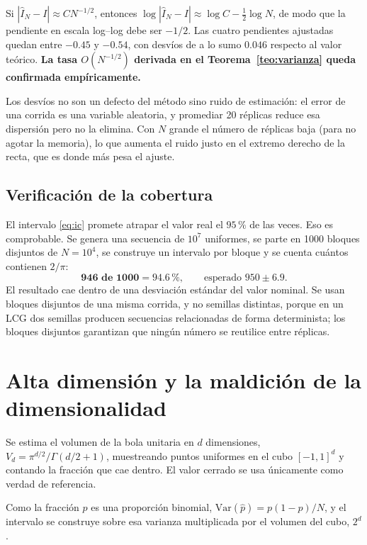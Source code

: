 Si $|\hat I_N - I| \approx C N^{-1/2}$, entonces
$\log|\hat I_N - I| \approx \log C - \tfrac12 \log N$, de modo que la pendiente
en escala log--log debe ser $-1/2$. Las cuatro pendientes ajustadas quedan
entre $-0.45$ y $-0.54$, con desvíos de a lo sumo $0.046$ respecto al valor
teórico. \textbf{La tasa $O(N^{-1/2})$ derivada en el
Teorema~\ref{teo:varianza} queda confirmada empíricamente.}

Los desvíos no son un defecto del método sino ruido de estimación: el error de
una corrida es una variable aleatoria, y promediar 20 réplicas reduce esa
dispersión pero no la elimina. Con $N$ grande el número de réplicas baja (para
no agotar la memoria), lo que aumenta el ruido justo en el extremo derecho de
la recta, que es donde más pesa el ajuste.

\subsection{Verificación de la cobertura}

El intervalo \eqref{eq:ic} promete atrapar el valor real el $95\,\%$ de las
veces. Eso es comprobable. Se genera una secuencia de $10^7$ uniformes, se
parte en 1000 bloques disjuntos de $N = 10^4$, se construye un intervalo por
bloque y se cuenta cuántos contienen $2/\pi$:
\[
  \textbf{946 de 1000} = 94.6\,\% ,
  \qquad \text{esperado } 950 \pm 6.9 .
\]
El resultado cae dentro de una desviación estándar del valor nominal. Se usan
bloques disjuntos de una misma corrida, y no semillas distintas, porque en un
LCG dos semillas producen secuencias relacionadas de forma determinista; los
bloques disjuntos garantizan que ningún número se reutilice entre réplicas.

\section{Alta dimensión y la maldición de la dimensionalidad}
\label{sec:mc-alta-dimension}

Se estima el volumen de la bola unitaria en $d$ dimensiones,
$V_d = \pi^{d/2}/\Gamma(d/2+1)$, muestreando puntos uniformes en el cubo
$[-1,1]^d$ y contando la fracción que cae dentro. El valor cerrado se usa
únicamente como verdad de referencia.

Como la fracción $p$ es una proporción binomial, $\mathrm{Var}(\hat p) =
p(1-p)/N$, y el intervalo se construye sobre esa varianza multiplicada por el
volumen del cubo, $2^d$.

\begin{table}[H]
\centering\small

\caption{Estimación de $V_d$ con $N = 200\,000$ puntos.}
\label{tab:mc-bola}
\end{table}

